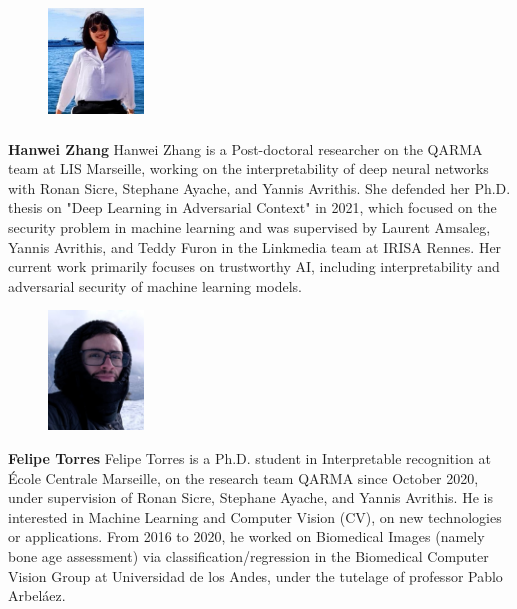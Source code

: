 \documentclass{article}
\begin{document}
\begin{figure}
\includegraphics[width=1in,height=1.25in,clip,keepaspectratio]{author/profile.jpeg}
\end{figure}\par
\textbf{Hanwei Zhang} Hanwei Zhang is a Post-doctoral researcher on the QARMA team at LIS Marseille, working on the interpretability of deep neural networks with Ronan Sicre, Stephane Ayache, and Yannis Avrithis. She defended her Ph.D. thesis on "Deep Learning in Adversarial Context" in 2021, which focused on the security problem in machine learning and was supervised by Laurent Amsaleg, Yannis Avrithis, and Teddy Furon in the Linkmedia team at IRISA Rennes. Her current work primarily focuses on trustworthy AI, including interpretability and adversarial security of machine learning models.\par

\begin{figure}
\includegraphics[width=1in,height=1.25in,clip,keepaspectratio]{author/felipe.jpg}
\end{figure}\par
\textbf{Felipe Torres} Felipe Torres is a Ph.D. student in Interpretable recognition at École Centrale Marseille, on the research team QARMA since October 2020, under supervision of Ronan Sicre, Stephane Ayache, and Yannis Avrithis. He is interested in Machine Learning and Computer Vision (CV), on new technologies or applications. From 2016 to 2020, he worked on Biomedical Images (namely bone age assessment) via classification/regression in the Biomedical Computer Vision Group at Universidad de los Andes, under the tutelage of professor Pablo Arbeláez. \par
\end{document}

